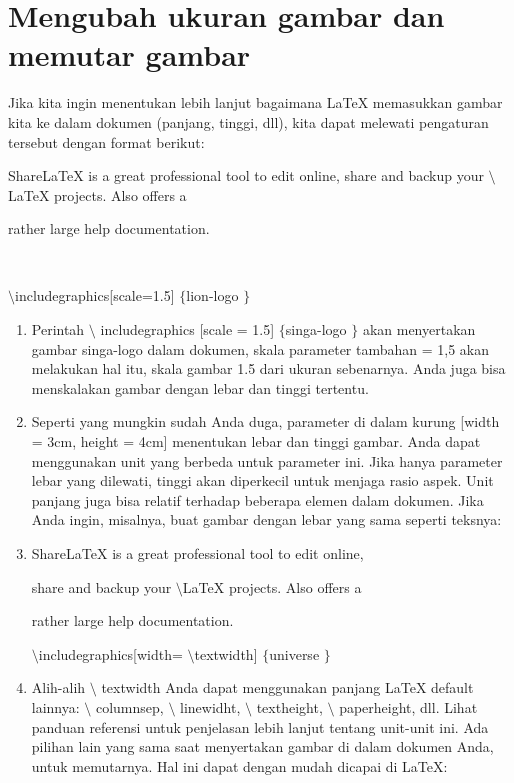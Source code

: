 \section{ Mengubah ukuran gambar dan memutar gambar }



\noindent 
Jika kita ingin menentukan lebih lanjut bagaimana LaTeX memasukkan gambar kita ke dalam dokumen (panjang, tinggi, dll), kita dapat melewati pengaturan tersebut dengan format berikut: \par
\vspace{16pt}
\noindent 
ShareLaTeX is a great professional tool to edit online,  
\vspace{12pt}
\noindent 
share and backup your  $  \setminus  $LaTeX projects. Also offers a 
 
rather large help documentation. \par

 $  $ \par

 $  \setminus  $includegraphics[scale=1.5] $  \{  $lion-logo $  \}  $ \par
\vspace{16pt}
\vspace{16pt}
\noindent 

\begin{enumerate}
	\item Perintah  $  \setminus  $ includegraphics [scale = 1.5]  $  \{  $singa-logo $  \}  $ akan menyertakan gambar singa-logo dalam dokumen, skala parameter tambahan = 1,5 akan melakukan hal itu, skala gambar 1.5 dari ukuran sebenarnya. Anda juga bisa menskalakan gambar dengan lebar dan tinggi tertentu. 
 
\item Seperti yang mungkin sudah Anda duga, parameter di dalam kurung [width = 3cm, height = 4cm] menentukan lebar dan tinggi gambar. Anda dapat menggunakan unit yang berbeda untuk parameter ini. Jika hanya parameter lebar yang dilewati, tinggi akan diperkecil untuk menjaga rasio aspek. Unit panjang juga bisa relatif terhadap beberapa elemen dalam dokumen. Jika Anda ingin, misalnya, buat gambar dengan lebar yang sama seperti teksnya: 

\item ShareLaTeX is a great professional tool to edit online,  

share and backup your  $  \setminus  $LaTeX projects. Also offers a 

rather large help documentation. 

 $  \setminus $includegraphics[width= $  \setminus $textwidth] $  \{  $universe $  \}  $ 
 
\item Alih-alih  $  \setminus $ textwidth Anda dapat menggunakan panjang LaTeX default lainnya:  $  \setminus $ columnsep,  $  \setminus $ linewidht,  $  \setminus $ textheight,  $  \setminus $ paperheight, dll. Lihat panduan referensi untuk penjelasan lebih lanjut tentang unit-unit ini. Ada pilihan lain yang sama saat menyertakan gambar di dalam dokumen Anda, untuk memutarnya. Hal ini dapat dengan mudah dicapai di LaTeX: 



\end{enumerate}

